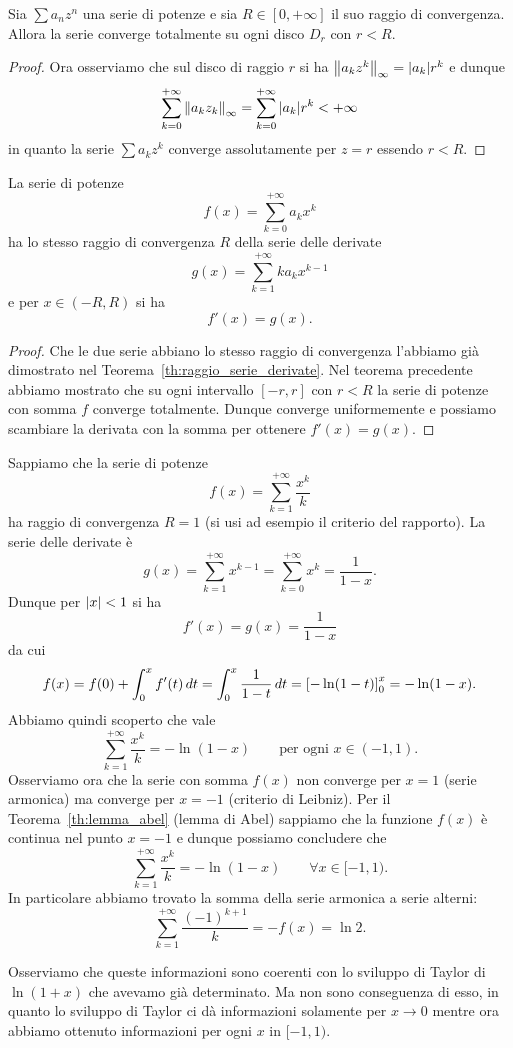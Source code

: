 \begin{theorem}
\label{th:convergenza_totale}
\mymark{***}%
Sia $\sum a_n z^n$ una serie di potenze e sia $R\in[0,+\infty]$ il suo raggio di convergenza. Allora la serie converge totalmente su ogni disco $D_r$ con $r<R$.
\end{theorem}
%
\begin{proof}
Ora osserviamo che sul disco di raggio $r$ si ha ${\left\Vert a_k z^k\right\Vert}_\infty = {\left|a_k\right|} r^k$ e dunque
\[
\sum_{k=0}^{+\infty} {\left\Vert a_k z_k\right\Vert}_\infty
= \sum_{k=0}^{+\infty} {\left|a_k\right|}r^k < +\infty
\]
in quanto la serie $\sum a_k z^k$ converge assolutamente per $z=r$ essendo $r<R$.
\end{proof}

\begin{corollary}
\label{cor:derivata_serie_potenze}
\mymark{**}
La serie di potenze
\[
  f(x) = \sum_{k=0}^{+\infty} a_k x^k
\]
ha lo stesso raggio di convergenza $R$ della serie delle derivate
\[
  g(x) = \sum_{k=1}^{+\infty} k a_k x^{k-1}
\]
e per $x\in (-R,R)$ si ha
\[
  f'(x) = g(x).
\]
\end{corollary}
%
\begin{proof}
Che le due serie abbiano lo stesso raggio di convergenza l'abbiamo già dimostrato nel Teorema~\ref{th:raggio_serie_derivate}. Nel teorema precedente abbiamo mostrato che su ogni intervallo $[-r,r]$ con $r<R$ la serie di potenze con somma $f$ converge totalmente. Dunque converge uniformemente e possiamo scambiare la derivata con la somma per ottenere $f'(x) = g(x)$.
\end{proof}

\begin{example}
Sappiamo che la serie di potenze
\[
f(x) = \sum_{k=1}^{+\infty} \frac{x^k}{k}
\]
ha raggio di convergenza $R=1$ (si usi ad esempio il criterio del rapporto). La serie delle derivate è
\[
 g(x) = \sum_{k=1}^{+\infty} x^{k-1} = \sum_{k=0}^{+\infty}x^k = \frac{1}{1-x}.
\]
Dunque per ${\left|x\right|}<1$ si ha
\[
  f'(x) = g(x) = \frac{1}{1-x}
\]
da cui
\[
 f(x) = f(0) + \int_0^x f'(t)\, dt = \int_0^x \frac{1}{1-t}\, dt
  = {\left[ -\ln(1-t) \right]}_0^x = -\ln(1-x).
\]
Abbiamo quindi scoperto che vale
\[
  \sum_{k=1}^{+\infty} \frac{x^k}{k} = - \ln (1-x) \qquad\text{per ogni $x\in (-1,1)$.}
\]
Osserviamo ora che la serie con somma $f(x)$
non converge per $x=1$ (serie armonica) ma
converge per $x=-1$ (criterio di Leibniz).
Per il Teorema~\ref{th:lemma_abel} (lemma di Abel)
sappiamo che la funzione $f(x)$ è continua nel punto $x=-1$ e dunque possiamo concludere che
\[
  \sum_{k=1}^{+\infty} \frac{x^k}{k} = -\ln(1-x)
  \qquad \forall x \in [-1,1).
\]
In particolare abbiamo trovato la somma della serie armonica a serie alterni:
\[
  \sum_{k=1}^{+\infty} \frac{(-1)^{k+1}}{k} = - f(x) = \ln 2.
\]

Osserviamo che queste informazioni sono coerenti con lo sviluppo di Taylor di $\ln(1+x)$ che avevamo già determinato. Ma non sono conseguenza di esso, in quanto lo sviluppo di Taylor ci dà informazioni solamente per $x\to 0$ mentre ora abbiamo ottenuto informazioni per ogni $x$ in $[-1,1)$.
 \end{example}

